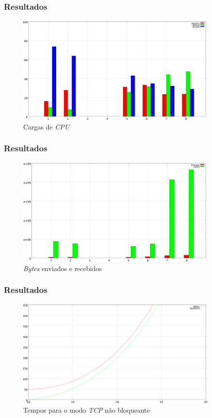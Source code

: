 \documentclass{beamer}
\begin{document}
\begin{frame} \frametitle{Resultados}
\begin{figure}[ht]
  \centering
  \includegraphics[width=0.9\textwidth]{img/cpu-graph.png}
  \caption{Cargas de \emph{CPU}}
  \label{fig:cpu-graph}
\end{figure}
\end{frame}

\begin{frame} \frametitle{Resultados}
\begin{figure}[ht!]
  \centering
  \includegraphics[width=0.9\textwidth]{img/net-graph.png}
  \caption{\emph{Bytes} enviados e recebidos}
  \label{fig:net-graph}
\end{figure}
\end{frame}

\begin{frame} \frametitle{Resultados}
\begin{figure}[ht]
  \centering
  \includegraphics[width=0.9\textwidth]{img/tcp-graph.png}
  \caption{Tempos para o modo \emph{TCP} não bloqueante}
  \label{fig:tcp-graph}
\end{figure}
\end{frame}
\end{document}
